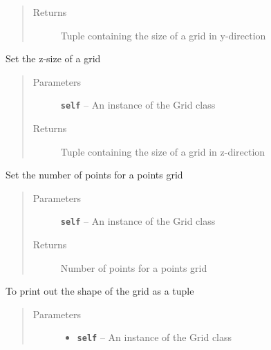 \documentclass[letterpaper,10pt,english]{sphinxmanual}
\begin{document}
\begin{fulllineitems}
\begin{fulllineitems}
\begin{quote}
\begin{description}
\item[{Returns}] \leavevmode
Tuple containing the size of a grid in y-direction

\end{description}\end{quote}

\end{fulllineitems}


\begin{fulllineitems}
\label{hyvr:hyvr.hyvr.grid.Grid.set_lz}
Set the z-size of a grid
\begin{quote}\begin{description}
\item[{Parameters}] \leavevmode
\textbf{\texttt{self}} -- An instance of the Grid class

\item[{Returns}] \leavevmode
Tuple containing the size of a grid in z-direction

\end{description}\end{quote}

\end{fulllineitems}


\begin{fulllineitems}
\label{hyvr:hyvr.hyvr.grid.Grid.set_points}
Set the number of points for a points grid
\begin{quote}\begin{description}
\item[{Parameters}] \leavevmode
\textbf{\texttt{self}} -- An instance of the Grid class

\item[{Returns}] \leavevmode
Number of points for a points grid

\end{description}\end{quote}

\end{fulllineitems}


\begin{fulllineitems}
\label{hyvr:hyvr.hyvr.grid.Grid.shape}
To print out the shape of the grid as a tuple
\begin{quote}\begin{description}
\item[{Parameters}] \leavevmode\begin{itemize}
\item {} 
\textbf{\texttt{self}} -- An instance of the Grid class


\end{itemize}
\end{description}
\end{quote}
\end{fulllineitems}
\end{fulllineitems}
\end{document}
